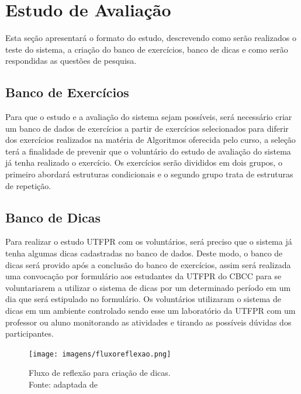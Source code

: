 \section{Estudo de Avaliação}

Esta seção apresentará o formato do estudo, descrevendo como serão realizados o teste do sistema, a criação do banco de exercícios, banco de dicas e como serão respondidas as questões de pesquisa.

\subsection{Banco de Exercícios}

Para que o estudo e a avaliação do sistema sejam possíveis, será necessário criar um banco de dados de exercícios a partir de exercícios selecionados para diferir dos exercícios realizados na matéria de Algoritmos oferecida pelo curso, a seleção terá a finalidade de prevenir que o voluntário do estudo de avaliação do sistema já tenha realizado o exercício. Os exercícios serão divididos em dois grupos, o primeiro abordará estruturas condicionais e o segundo grupo trata de estruturas de repetição.

\subsection{Banco de Dicas}

Para realizar o estudo UTFPR com os voluntários, será preciso que o sistema já tenha algumas dicas cadastradas no banco de dados. Deste modo, o banco de dicas será provido após a conclusão do banco de exercícios, assim será realizada uma convocação por formulário  aos estudantes da UTFPR do CBCC para se voluntariarem a utilizar o sistema de dicas por um determinado período em um dia que será estipulado no formulário. Os voluntários utilizaram o sistema de dicas em um ambiente controlado sendo esse um laboratório da UTFPR com um professor ou aluno monitorando as atividades e tirando as possíveis dúvidas dos participantes. 

\begin{figure}[ht]
	\centering
	\captionsetup{justification=centering}
	\texttt{[image: imagens/fluxoreflexao.png]}
	\caption[Fluxo de reflexão para criação de dicas]{Fluxo de reflexão para criação de dicas. \\ Fonte: adaptada de }
	\label{figura:fluxoreflexao}
\end{figure}

